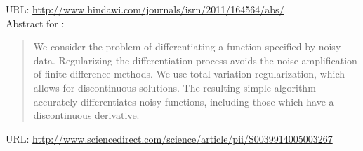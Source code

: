 \documentclass[11pt]{article}
\begin{document}
\begin{homeworkProblem}
\begin{quote}
    \end{quote}

    URL: \url{http://www.hindawi.com/journals/isrn/2011/164564/abs/} \\

    Abstract for \citet{chartrand:2011}:

    \begin{quote}

        We consider the problem of differentiating a function specified by
        noisy data. Regularizing the differentiation process avoids the noise
        amplification of finite-difference methods. We use total-variation
        regularization, which allows for discontinuous solutions. The resulting
        simple algorithm accurately differentiates noisy functions, including
        those which have a discontinuous derivative.

    \end{quote}

    URL:
    \url{http://www.sciencedirect.com/science/article/pii/S0039914005003267} \\

\end{homeworkProblem}

    
\end{document}
